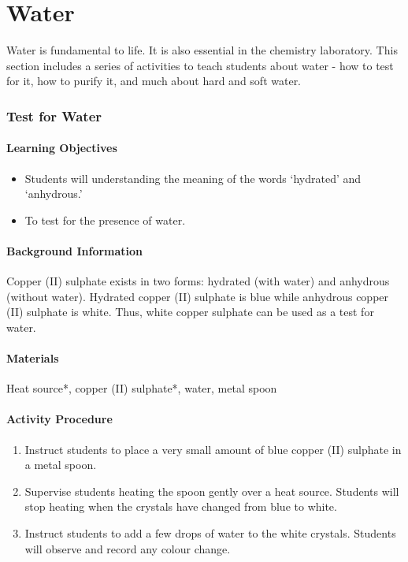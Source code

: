 \chapter{Water}

Water is fundamental to life. It is also essential in the chemistry laboratory. This section includes a series of activities to teach students about water - how to test for it, how to purify it, and much about hard and soft water.

\subsection{Test for Water}

\subsubsection*{Learning Objectives}
\begin{itemize}
\item{Students will understanding the meaning of the words `hydrated' and `anhydrous.'}
\item{To test for the presence of water.}
\end{itemize}

\subsubsection*{Background Information}
Copper (II) sulphate exists in two forms: hydrated (with water) and anhydrous (without water). Hydrated copper (II) sulphate is blue while anhydrous copper (II) sulphate is white. Thus, white copper sulphate can be used as a test for water.

\subsubsection*{Materials}
Heat source*, copper (II) sulphate*, water, metal spoon

\subsubsection*{Activity Procedure}
\begin{enumerate}
\item{Instruct students to place a very small amount of blue copper (II) sulphate in a metal spoon.}
\item{Supervise students heating the spoon gently over a heat source. Students will stop heating when the crystals have changed from blue to white.}
\item{Instruct students to add a few drops of water to the white crystals. Students will observe and record any colour change.}
\end{enumerate}

